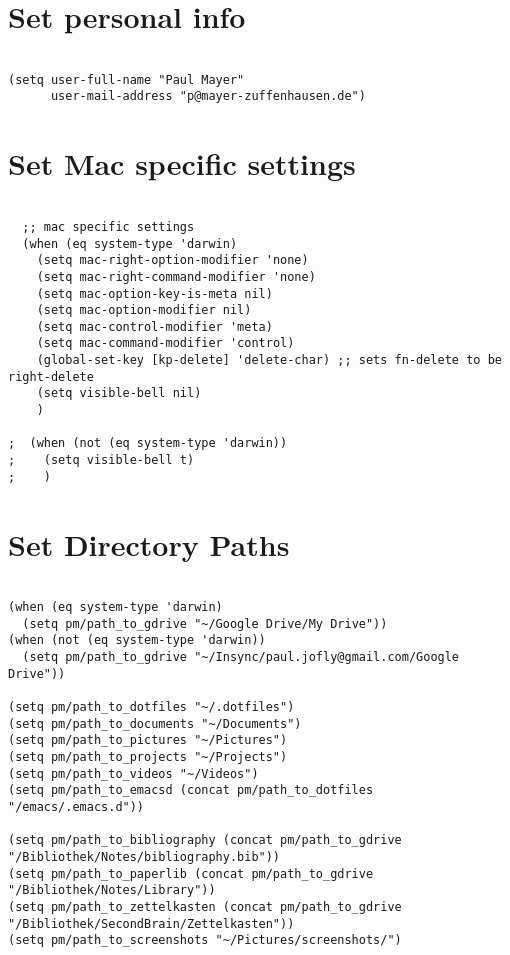 \documentclass[11pt]{article}
\begin{document}
\section{Set personal info}
\label{sec:org3ec74fa}

\begin{verbatim}

(setq user-full-name "Paul Mayer"
	  user-mail-address "p@mayer-zuffenhausen.de")

\end{verbatim}

\section{Set Mac specific settings}
\label{sec:org669182a}

\begin{verbatim}

  ;; mac specific settings
  (when (eq system-type 'darwin)
	(setq mac-right-option-modifier 'none)
	(setq mac-right-command-modifier 'none)
	(setq mac-option-key-is-meta nil)
	(setq mac-option-modifier nil)
	(setq mac-control-modifier 'meta)
	(setq mac-command-modifier 'control)
	(global-set-key [kp-delete] 'delete-char) ;; sets fn-delete to be right-delete
	(setq visible-bell nil)
	)

;  (when (not (eq system-type 'darwin))
;    (setq visible-bell t)
;    )

\end{verbatim}

\section{Set Directory Paths}
\label{sec:orgb091d8f}
\begin{verbatim}

(when (eq system-type 'darwin)
  (setq pm/path_to_gdrive "~/Google Drive/My Drive"))
(when (not (eq system-type 'darwin))
  (setq pm/path_to_gdrive "~/Insync/paul.jofly@gmail.com/Google Drive"))

(setq pm/path_to_dotfiles "~/.dotfiles")
(setq pm/path_to_documents "~/Documents")
(setq pm/path_to_pictures "~/Pictures")
(setq pm/path_to_projects "~/Projects")
(setq pm/path_to_videos "~/Videos")
(setq pm/path_to_emacsd (concat pm/path_to_dotfiles "/emacs/.emacs.d"))

(setq pm/path_to_bibliography (concat pm/path_to_gdrive "/Bibliothek/Notes/bibliography.bib"))
(setq pm/path_to_paperlib (concat pm/path_to_gdrive "/Bibliothek/Notes/Library"))
(setq pm/path_to_zettelkasten (concat pm/path_to_gdrive "/Bibliothek/SecondBrain/Zettelkasten"))
(setq pm/path_to_screenshots "~/Pictures/screenshots/")

\end{verbatim}
\end{document}
